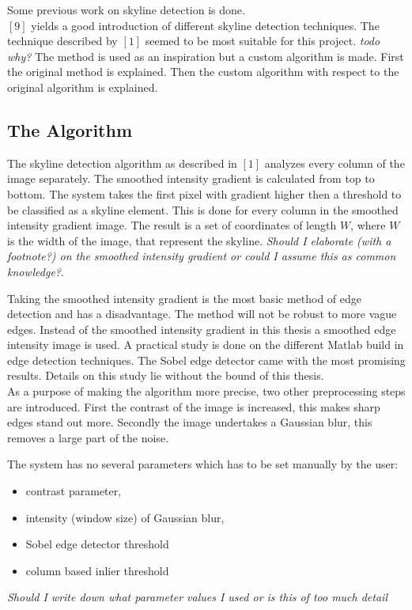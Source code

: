 \documentclass[10pt]{article}
\begin{document}
Some previous work on skyline detection is done.\\
$[9]$ yields a good introduction of different skyline detection techniques.  The technique described by $[1]$ seemed to be most suitable for this project.  
\textit{todo why?}
The method is used as an inspiration but a custom algorithm is made. First
the original method is explained. Then the custom algorithm with respect to the original algorithm is explained.


 \subsection{The Algorithm}

The skyline detection algorithm as described in $[1]$ analyzes every column of
the image separately.  The smoothed intensity gradient is calculated from top
to bottom.  The system takes the first pixel with gradient higher then a threshold to be
classified as a skyline element.  This is done for every column in the smoothed
intensity gradient image. The result is a set of coordinates of length $W$,
where $W$ is the width of the image, that represent the skyline.
\textit{Should I elaborate (with a footnote?) on the smoothed
intensity gradient or could I assume this as common knowledge?}. 

Taking the smoothed intensity gradient is the most basic method of edge detection
and has a disadvantage. The method will not be robust to more vague edges.
Instead of the smoothed intensity gradient in this thesis a smoothed edge intensity image is
used.  A practical study is done on the different Matlab build in edge
detection techniques. The Sobel edge detector came with the most promising
results.  Details on this study lie without the bound of this thesis.\\

As a purpose of making the algorithm more precise, two other preprocessing
steps are introduced. First the contrast of the image is increased, this makes
sharp edges stand out more.  Secondly the image undertakes a Gaussian blur,
this removes a large part of the noise.

The system has no several parameters which has to be set manually by the user:
\begin{itemize}
\item contrast parameter, 
\item intensity (window size) of Gaussian blur,
\item Sobel edge detector threshold
\item column based inlier threshold
\end{itemize}
\textit{Should I write down what parameter values I used or is this of too much
detail}
\end{document}
